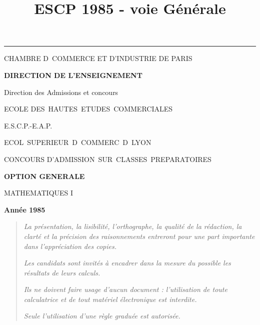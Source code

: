 \documentclass[11pt]{article}%
\title{\bf \vspace{-2cm} ESCP 1985 - voie Générale} %
\author{} %
\date{} %
\begin{document}
\maketitle %
\vspace{-1.4cm}\hrule %
\thispagestyle{fancy}

\vspace*{.2cm}




\begin{center}
{\small CHAMBRE D\E\ COMMERCE ET D'INDUSTRIE DE PARIS}

\textbf{DIRECTION DE L'ENSEIGNEMENT}

Direction des Admissions et concours

\underline{\hspace*{3cm}}

{\Large ECOLE DES\ HAUTES\ ETUDES\ COMMERCIALES}

{\Large E.S.C.P.-E.A.P.}

{\Large ECOL\E\ SUPERIEUR\E\ D\E\ COMMERC\E\ D\E\ LYON}{\large }

CONCOURS D'ADMISSION\ SUR\ CLASSES\ PREPARATOIRES

\underline{\hspace*{3cm}}

\textbf{OPTION GENERALE}

{\Large MATHEMATIQUES I}

\textbf{Année 1985}

\underline{\hspace*{3cm}}
\end{center}

\begin{quotation}
\noindent \textsl{La présentation, la lisibilité, l'orthographe, la
qualité
de la rédaction, la clarté et la précision des raisonnements entreront
pour
une part importante dans l'appréciation des copies.}

\noindent \textsl{Les candidats sont invités à encadrer dans la mesure
du
possible les résultats de leurs calculs.}

\noindent \textsl{Ils ne doivent faire usage d'aucun document :
l'utilisation de toute calculatrice et de tout matériel électronique
est
interdite.}

\noindent \textsl{Seule l'utilisation d'une règle graduée est
autorisée.}

\noindent \textsl{\hrulefill }
\end{quotation}
\end{document}
